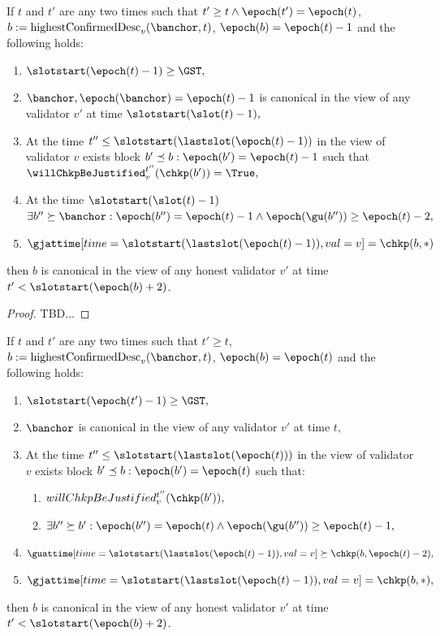 \documentclass{article}
\begin{document}
\begin{lemma}
If $t$ and $t'$ are any two times such that $t' \geq t \wedge \epoch(t') = \epoch(t)$, $b := \text{highestConfirmedDesc}_v(\banchor, t)$, $\epoch(b) = \epoch(t) - 1$ and the following holds:

\begin{enumerate}
    \item $\slotstart(\epoch(t) - 1) \geq \GST,$
    \item $\banchor, \epoch(\banchor) = \epoch(t) - 1$ is canonical in the view of any validator $v'$ at time $\slotstart(\slot(t) - 1),$
    \item At the time $t'' \leq \slotstart(\lastslot(\epoch(t) - 1))$ in the view of validator $v$ exists block $b' \preceq b : \epoch(b') = \epoch(t) - 1$ such that $\willChkpBeJustified^{t''}_v(\chkp(b')) = \True,$
    \item At the time $\slotstart(\slot(t) - 1)$ $\exists b'' \succeq \banchor : \epoch(b'') = \epoch(t) - 1 \wedge \epoch(\gu(b'')) \geq \epoch(t) - 2,$
    \item $\gjattime[time=\slotstart(\lastslot(\epoch(t) - 1)),val=v] = \chkp(b, *)$
\end{enumerate}

then $b$ is canonical in the view of any honest validator $v'$ at time $t' < \slotstart(\epoch(b) + 2)$.
\end{lemma}

\begin{proof}
    TBD...
\end{proof}



\begin{lemma}
   If $t$ and $t'$ are any two times such that $t' \geq t$, $b := \text{highestConfirmedDesc}_v(\banchor, t)$, $\epoch(b) = \epoch(t)$ and the following holds:
    
    \begin{enumerate}
        \item $\slotstart(\epoch(t') - 1) \geq \GST,$
        \item $\banchor$ is canonical in the view of any validator $v'$ at time $t,$
        \item At the time $t'' \leq \slotstart(\lastslot(\epoch(t)))$ in the view of validator $v$ exists block $b' \preceq b : \epoch(b') = \epoch(t)$ such that:
        \begin{enumerate}
            \item $willChkpBeJustified^{t''}_v(\chkp(b')),$
            \item $\exists b'' \succeq b' : \epoch(b'') = \epoch(t) \wedge \epoch(\gu(b'')) \geq \epoch(t) - 1,$
        \end{enumerate}
        \item $\guattime[time=\slotstart(\lastslot(\epoch(t) - 1)),val=v] \succeq \chkp(b, \epoch(t) - 2),$
        \item $\gjattime[time=\slotstart(\lastslot(\epoch(t) - 1)),val=v] = \chkp(b, *),$
    \end{enumerate}
    
    then $b$ is canonical in the view of any honest validator $v'$ at time $t' < \slotstart(\epoch(b) + 2)$.
\end{lemma}
\end{document}
